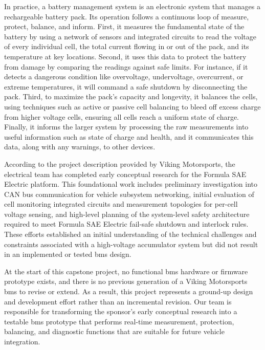 In practice, a battery management system is an electronic system that manages a rechargeable battery pack. Its operation follows a continuous loop of measure, protect, balance, and inform. First, it measures the fundamental state of the battery by using a network of sensors and integrated circuits to read the voltage of every individual cell, the total current flowing in or out of the pack, and its temperature at key locations. Second, it uses this data to protect the battery from damage by comparing the readings against safe limits. For instance, if it detects a dangerous condition like overvoltage, undervoltage, overcurrent, or extreme temperatures, it will command a safe shutdown by disconnecting the pack. Third, to maximize the pack’s capacity and longevity, it balances the cells, using techniques such as active or passive cell balancing to bleed off excess charge from higher voltage cells, ensuring all cells reach a uniform state of charge. Finally, it informs the larger system by processing the raw measurements into useful information such as state of charge and health, and it communicates this data, along with any warnings, to other devices.

According to the project description provided by Viking Motorsports, the electrical team has completed early conceptual research for the Formula SAE Electric platform. This foundational work includes preliminary investigation into CAN bus communication for vehicle subsystem networking, initial evaluation of cell monitoring integrated circuits and measurement topologies for per-cell voltage sensing, and high-level planning of the system-level safety architecture required to meet Formula SAE Electric fail-safe shutdown and interlock rules. These efforts established an initial understanding of the technical challenges and constraints associated with a high-voltage accumulator system but did not result in an implemented or tested \gls{bms} design.

At the start of this capstone project, no functional \gls{bms} hardware or firmware prototype exists, and there is no previous generation of a Viking Motorsports \gls{bms} to revise or extend. As a result, this project represents a ground-up design and development effort rather than an incremental revision. Our team is responsible for transforming the sponsor’s early conceptual research into a testable \gls{bms} prototype that performs real-time measurement, protection, balancing, and diagnostic functions that are suitable for future vehicle integration.

